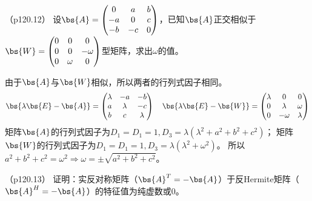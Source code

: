 \documentclass[12pt, a4paper, oneside, UTF8]{ctexbook}
\begin{document}
\begin{question}（p120.12）
    设$\bs{A}=\begin{pmatrix}
        0 & a& b \\
        -a & 0 &c \\
        -b & -c & 0
    \end{pmatrix}$，已知$\bs{A}$正交相似于$\bs{W}=\begin{pmatrix}
        0 & 0& 0 \\
        0 & 0 &-\omega \\
        0 & \omega & 0
    \end{pmatrix}$型矩阵，求出$\omega$的值。
\end{question}

\begin{solution}
    由于$\bs{A}$与$\bs{W}$相似，所以两者的行列式因子相同。
    \begin{align*}
        \bs{\lambda \bs{E}-\bs{A}}=\begin{pmatrix}
            \lambda & -a& -b \\
            a & \lambda & -c \\
            b & c & \lambda 
        \end{pmatrix} \quad\bs{\lambda \bs{E}-\bs{W}}=\begin{pmatrix}
            \lambda & 0& 0 \\
            0 & \lambda & \omega \\
            0 & -\omega & \lambda 
        \end{pmatrix}
    \end{align*}
    矩阵$\bs{A}$的行列式因子为$D_1=D_1=1,D_3=\lambda(\lambda^2+a^2+b^2+c^2)$；
    矩阵$\bs{W}$的行列式因子为$D_1=D_1=1,D_3=\lambda(\lambda^2+\omega^2)$。
    所以$a^2+b^2+c^2=\omega^2 \Rightarrow \omega=\pm \sqrt{a^2+b^2+c^2}$。

\end{solution}

\begin{question}（p120.13）
    证明：实反对称矩阵（$\bs{A}^T=-\bs{A}$）于反Hermite矩阵（$\bs{A}^H=-\bs{A}$）的特征值为纯虚数或0。
\end{question}
\end{document}
